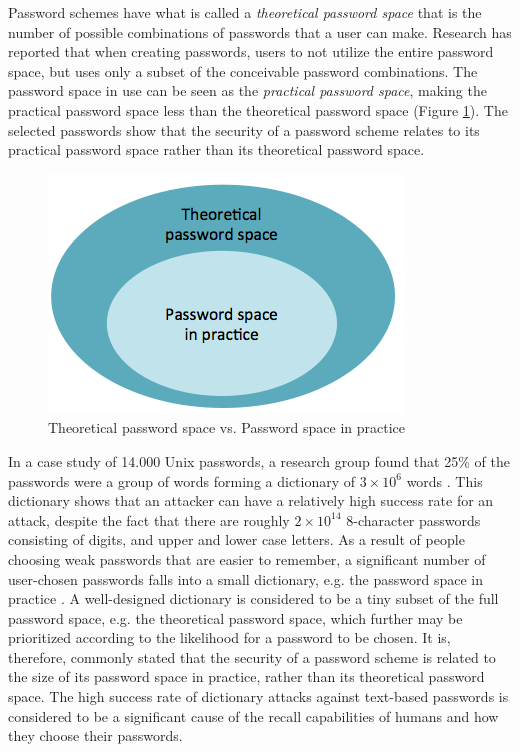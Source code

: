   Password schemes have what is called a {\it theoretical password space} that is the number of possible combinations of passwords that a user can make. Research has reported that when creating passwords, users to not utilize the entire password space, but uses only a subset of the conceivable password combinations. The password space in use can be seen as the {\it practical password space}, making the practical password space less than the theoretical password space (Figure \ref{fig:memorable}). The selected passwords show that the security of a password scheme relates to its practical password space rather than its theoretical password space.

    \begin{figure}[H]
      \centering
      \includegraphics[scale=0.55]{pics/review/EmpiricalVsPractical.png}
      \caption{Theoretical password space vs. Password space in practice}
      \label{fig:memorable}
    \end{figure}

  In a case study of 14.000 Unix passwords, a research group found that 25\% of the passwords were a group of words forming a dictionary of $3\times10^{6}$ words \cite{UnixPasswords}. This dictionary shows that an attacker can have a relatively high success rate for an attack, despite the fact that there are roughly $2\times10^{14}$ 8-character passwords consisting of digits, and upper and lower case letters. As a result of people choosing weak passwords that are easier to remember, a significant number of user-chosen passwords falls into a small dictionary, e.g. the password space in practice \cite{Tao}. A well-designed dictionary is considered to be a tiny subset of the full password space, e.g. the theoretical password space, which further may be prioritized according to the likelihood for a password to be chosen. It is, therefore, commonly stated that the security of a password scheme is related to the size of its password space in practice, rather than its theoretical password space. The high success rate of dictionary attacks against text-based passwords is considered to be a significant cause of the recall capabilities of humans and how they choose their passwords.

